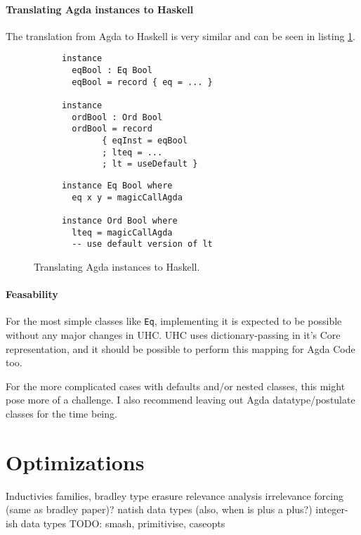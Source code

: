 \documentclass[12pt, a4paper, twoside]{report}
\begin{document}
\paragraph{Translating Agda instances to Haskell}
The translation from Agda to Haskell is very similar and can be seen in listing \ref{lst:inst-agda-hs}.
\begin{figure}
\begin{subfigure}[b]{0.5\textwidth}
\begin{lstlisting}
instance
  eqBool : Eq Bool
  eqBool = record { eq = ... }

instance
  ordBool : Ord Bool
  ordBool = record
        { eqInst = eqBool
        ; lteq = ...
        ; lt = useDefault }
\end{lstlisting}
\end{subfigure}
\hspace{10pt}
\begin{subfigure}[b]{0.5\textwidth}
\begin{lstlisting}
instance Eq Bool where
  eq x y = magicCallAgda

instance Ord Bool where
  lteq = magicCallAgda
  -- use default version of lt
\end{lstlisting}
\end{subfigure}
\caption{Translating Agda instances to Haskell.}
\label{lst:inst-agda-hs}
\end{figure}


\paragraph{Feasability}
For the most simple classes like \texttt{Eq}, implementing it is expected to be
possible without any major changes in UHC. UHC uses dictionary-passing in it's Core representation,
and it should be possible to perform this mapping for Agda Code too.

For the more complicated cases with defaults and/or nested classes, this might pose more of a challenge.
I also recommend leaving out Agda datatype/postulate classes for the time being.


\section{Optimizations}
Inductivies families, bradley
type erasure
relevance analysis
irrelevance
forcing (same as bradley paper)?
natish data types (also, when is plus a plus?)
integer-ish data types
TODO: smash, primitivise, caseopts
\end{document}
